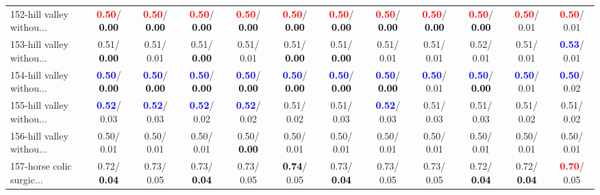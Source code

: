 \begin{table}[h]
\begin{center}
{\begin{tabular}{lc|c|c|c|c|c|c|c|c|c|c}
152-hill valley withou... & \textcolor{red}{\textbf{  0.50}}/\textcolor{black}{\textbf{  0.00}} & \textcolor{red}{\textbf{  0.50}}/\textcolor{black}{\textbf{  0.00}} & \textcolor{red}{\textbf{  0.50}}/\textcolor{black}{\textbf{  0.00}} & \textcolor{red}{\textbf{  0.50}}/\textcolor{black}{\textbf{  0.00}} & \textcolor{red}{\textbf{  0.50}}/\textcolor{black}{\textbf{  0.00}} & \textcolor{red}{\textbf{  0.50}}/\textcolor{black}{\textbf{  0.00}} & \textcolor{red}{\textbf{  0.50}}/\textcolor{black}{\textbf{  0.00}} & \textcolor{red}{\textbf{  0.50}}/\textcolor{black}{\textbf{  0.00}} & \textcolor{red}{\textbf{  0.50}}/\textcolor{black}{\textbf{  0.00}} & \textcolor{red}{\textbf{  0.50}}/  0.01 & \textcolor{red}{\textbf{  0.50}}/  0.01 \\
153-hill valley withou... &   0.51/\textcolor{black}{\textbf{  0.00}} &   0.51/  0.01 &   0.51/\textcolor{black}{\textbf{  0.00}} &   0.51/  0.01 &   0.51/\textcolor{black}{\textbf{  0.00}} &   0.51/\textcolor{black}{\textbf{  0.00}} &   0.51/  0.01 &   0.51/  0.01 &   0.52/  0.01 &   0.51/  0.01 & \textcolor{blue}{\textbf{  0.53}}/  0.01 \\
154-hill valley withou... & \textcolor{blue}{\textbf{  0.50}}/\textcolor{black}{\textbf{  0.00}} & \textcolor{blue}{\textbf{  0.50}}/\textcolor{black}{\textbf{  0.00}} & \textcolor{blue}{\textbf{  0.50}}/\textcolor{black}{\textbf{  0.00}} & \textcolor{blue}{\textbf{  0.50}}/\textcolor{black}{\textbf{  0.00}} & \textcolor{blue}{\textbf{  0.50}}/\textcolor{black}{\textbf{  0.00}} & \textcolor{blue}{\textbf{  0.50}}/\textcolor{black}{\textbf{  0.00}} & \textcolor{blue}{\textbf{  0.50}}/\textcolor{black}{\textbf{  0.00}} & \textcolor{blue}{\textbf{  0.50}}/  0.01 & \textcolor{blue}{\textbf{  0.50}}/\textcolor{black}{\textbf{  0.00}} & \textcolor{blue}{\textbf{  0.50}}/  0.01 & \textcolor{blue}{\textbf{  0.50}}/  0.02 \\
155-hill valley withou... & \textcolor{blue}{\textbf{  0.52}}/  0.03 & \textcolor{blue}{\textbf{  0.52}}/  0.03 & \textcolor{blue}{\textbf{  0.52}}/  0.02 & \textcolor{blue}{\textbf{  0.52}}/  0.02 &   0.51/  0.02 &   0.51/  0.03 & \textcolor{blue}{\textbf{  0.52}}/  0.03 &   0.51/  0.03 &   0.51/  0.03 &   0.51/  0.02 &   0.51/  0.02 \\
156-hill valley withou... &   0.50/  0.01 &   0.50/  0.01 &   0.50/  0.01 &   0.50/\textcolor{black}{\textbf{  0.00}} &   0.50/  0.01 &   0.50/  0.01 &   0.50/  0.01 &   0.50/  0.01 &   0.50/  0.01 &   0.50/  0.01 &   0.50/  0.01 \\ \hline
157-horse colic surgic... &   0.72/\textcolor{black}{\textbf{  0.04}} &   0.73/  0.05 &   0.73/\textcolor{black}{\textbf{  0.04}} &   0.73/  0.05 & \textcolor{black}{\textbf{  0.74}}/  0.05 &   0.73/\textcolor{black}{\textbf{  0.04}} &   0.73/  0.05 &   0.73/  0.05 &   0.72/\textcolor{black}{\textbf{  0.04}} &   0.72/\textcolor{black}{\textbf{  0.04}} & \textcolor{red}{\textbf{  0.70}}/  0.05 \\

\end{tabular}}
\end{center}
\end{table}
